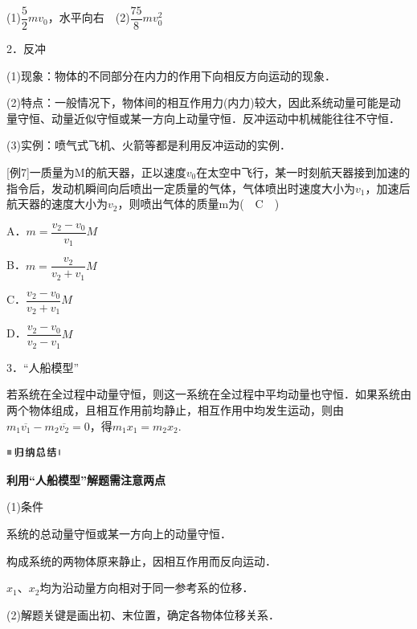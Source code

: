 \begin{solution}
	(1)$\dfrac{5}{2} m v_{0}$，水平向右　(2)$\dfrac{75}{8} m v_{0}^{2}$
\end{solution}
2．反冲

(1)现象：物体的不同部分在内力的作用下向相反方向运动的现象．

(2)特点：一般情况下，物体间的相互作用力(内力)较大，因此系统动量可能是动量守恒、动量近似守恒或某一方向上动量守恒．反冲运动中机械能往往不守恒．

(3)实例：喷气式飞机、火箭等都是利用反冲运动的实例．

{[}例7{]}一质量为M的航天器，正以速度$v_0$在太空中飞行，某一时刻航天器接到加速的指令后，发动机瞬间向后喷出一定质量的气体，气体喷出时速度大小为$v_1$，加速后航天器的速度大小为$v_2$，则喷出气体的质量m为(　C　)

A．$m=\dfrac{v_{2}-v_{0}}{v_{1}} M$　　 

B．$m=\dfrac{v_{2}}{v_{2}+v_{1}} M$

C．$\dfrac{v_{2}-v_{0}}{v_{2}+v_{1}} M$　　 

D．$\dfrac{v_{2}-v_{0}}{v_{2}-v_{1}} M$

3．``人船模型''

若系统在全过程中动量守恒，则这一系统在全过程中平均动量也守恒．如果系统由两个物体组成，且相互作用前均静止，相互作用中均发生运动，则由$m_{1} \overline{v_{1}}-m_{2} \overline{v_{2}}=0$，得$m_{1} x_{1}=m_{2} x_{2}$.　



\begin{center}\includegraphics[width=0.70764in,height=0.12292in]{media/image13.png}

\textbf{利用``人船模型''解题需注意两点}
\end{center}


(1)条件

系统的总动量守恒或某一方向上的动量守恒．

构成系统的两物体原来静止，因相互作用而反向运动．

$x_1$、$x_2$均为沿动量方向相对于同一参考系的位移．

(2)解题关键是画出初、末位置，确定各物体位移关系．

